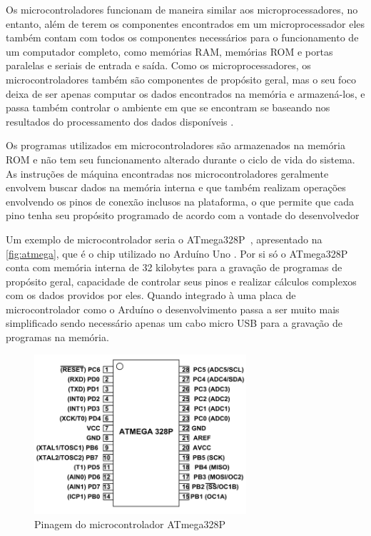 Os microcontroladores funcionam de maneira similar aos microprocessadores, no entanto, além de terem os componentes encontrados em um microprocessador eles também contam com todos os componentes necessários para o funcionamento de um computador completo, como memórias RAM, memórias ROM e portas paralelas e seriais de entrada e saída. Como os microprocessadores, os microcontroladores também são componentes de propósito geral, mas o seu foco deixa de ser apenas computar os dados encontrados na memória e armazená-los, e passa também controlar o ambiente em que se encontram se baseando nos resultados do processamento dos dados disponíveis \cite{ayala:1991}.

Os programas utilizados em microcontroladores são armazenados na memória ROM e não tem seu funcionamento alterado durante o ciclo de vida do sistema. As instruções de máquina encontradas nos microcontroladores geralmente envolvem buscar dados na memória interna e que também realizam operações envolvendo os pinos de conexão inclusos na plataforma, o que permite que cada pino tenha seu propósito programado de acordo com a vontade do desenvolvedor \cite{ayala:1991}


Um exemplo de microcontrolador seria o ATmega328P~\cite{atmel}, apresentado na \autoref{fig:atmega},  que é o chip utilizado no Arduíno Uno \cite{arduino}. Por si só o ATmega328P conta com memória interna de 32 kilobytes para a gravação de programas de propósito geral, capacidade de controlar seus pinos e realizar cálculos complexos com os dados providos por eles. Quando integrado à uma placa de microcontrolador como o Arduíno o desenvolvimento passa a ser muito mais simplificado sendo necessário apenas um cabo micro USB para a gravação de programas na memória.

\begin{figure}[ht]
    \centering
    \includegraphics[width=0.7\textwidth, keepaspectratio]{resources/ATMega328P-Pinout.png}
    \caption{Pinagem do microcontrolador ATmega328P}
    \label{fig:atmega}
\end{figure}

